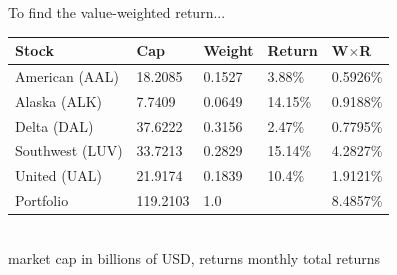 To find the value-weighted return...
\begin{center}
	{\color{blue}
	\begin{tabular}{l|llll}
		\textbf{Stock} & \textbf{Cap} & \textbf{W}eight & \textbf{R}eturn & \textbf{W$\times$R}\\ \hline
		American (AAL) & 18.2085 & 0.1527 & 3.88\% & 0.5926\% \\
		Alaska (ALK) & 7.7409 & 0.0649 & 14.15\% & 0.9188\% \\
		Delta (DAL) & 37.6222 & 0.3156 & 2.47\% & 0.7795\% \\
		Southwest (LUV) & 33.7213 & 0.2829 & 15.14\% & 4.2827\% \\
		United (UAL) & 21.9174 & 0.1839 & 10.4\% & 1.9121\% \\ \hline 
		Portfolio & 119.2103 & 1.0 & & 8.4857\%\\\hline
	\end{tabular}
	}\\
	{\footnotesize market cap in billions of USD, returns monthly total returns}
\end{center}